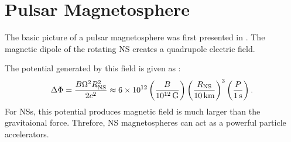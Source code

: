 \section{Pulsar Magnetosphere}

The basic picture of a pulsar magnetosphere was first presented in
\cite{goldreich_1969_pulsar-electrodynamics}.  The magnetic dipole
of the rotating \ac{NS} creates a quadrupole electric field.

The potential generated
by this field is given as \citep{goldreich_1969_pulsar-electrodynamics}:
\begin{equation}
\Delta \Phi = \frac{B \Omega^2 R_\text{NS}^2}{2c^2}
\approx 6\times 10^{12} 
\left(\frac{B}{10^{12}\,\text{G}}\right)
\left(\frac{R_\text{NS}}{10\,\text{km}}\right)^3
\left(\frac{P}{1\,\text{s}}\right).
\end{equation}
For \acp{NS}, this potential produces magnetic field is much larger than
the gravitaional force. Threfore, \ac{NS} magnetospheres can act as a
powerful particle accelerators.




